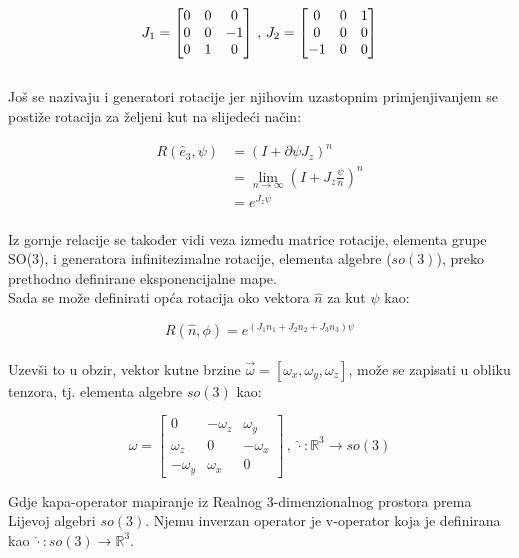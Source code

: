 \documentclass[times, utf8, diplomski, numeric]{fer}
\begin{document}
	\begin{equation}
		J_1 = 
		\begin{bmatrix}
		0	&	0	&	0 \\
		0	&	0	&	-1 \\
		0	&	1 	&	0
		\end{bmatrix} \\
		\, , \, J_2 = 
		\begin{bmatrix}
		0	&	0	&	1 \\
		0	&	0	&	0 \\
		-1	&	0 	&	0
		\end{bmatrix} 
	\end{equation}
	\\
	Još se nazivaju i generatori rotacije jer njihovim uzastopnim primjenjivanjem se postiže rotacija za željeni kut na slijedeći način:
	
	\begin{align}
		R( \hat{e}_3, \psi ) & = (I + \partial \psi J_z)^n \\
							 & = \lim_{n \rightarrow \infty} \left (I + J_z \frac{\psi}{n} \right )^n \\
							 & = e^{J_z \psi}
	\end{align}
	\\
	Iz gornje relacije se također vidi veza između matrice rotacije, elementa grupe SO(3), i generatora infinitezimalne rotacije, elementa algebre ($so(3)$), preko prethodno definirane eksponencijalne mape. \\
	Sada se može definirati opća rotacija oko vektora $\hat{n}$ za kut $\psi$ kao:
	
	\begin{equation}
		R( \hat{n}, \phi ) = e^{(J_1 n_1 + J_2 n_2 + J_3 n_3)\psi}
	\end{equation}
	\\
	Uzevši to u obzir, vektor kutne brzine $\vec{\omega} = [\omega_x, \omega_y, \omega_z]$, može se zapisati u obliku tenzora, tj. elementa algebre $so(3)$ kao: 
	
	\begin{equation}
		\hat{\omega} = 
		\begin{bmatrix}
			0			&	-\omega_z	& 	\omega_y \\
			\omega_z	&	0			& 	-\omega_x \\
			-\omega_y	&	\omega_x	&	0
		\end{bmatrix} \, , \, \hat{\cdot}: \mathbb{R}^3 \rightarrow so(3)
	\end{equation}
	
	\noindent Gdje kapa-operator mapiranje iz Realnog 3-dimenzionalnog prostora prema Lijevoj algebri $so(3)$. Njemu inverzan operator je v-operator koja je definirana kao $\check{\cdot}:so(3) \rightarrow \mathbb{R}^3$.
	
\end{document}
